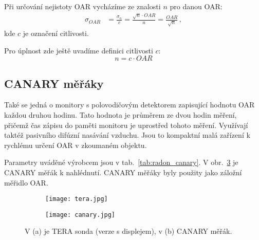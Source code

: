 Při určování nejistoty OAR vycházíme ze znalosti $n$ pro danou OAR:
\begin{align}
    \sigma_{OAR}&=\frac{\sigma_n}{c}=\frac{\sqrt{n}\cdot OAR}{n}=\frac{OAR}{\sqrt{n}}\,,
    \label{eq:radon_OAR_odchylka}
\end{align}
kde $c$ je označení citlivosti.

Pro úplnost zde ještě uvadíme definici citlivosti $c$:
\begin{equation}
    n=c\cdot OAR
    \label{eq:radon_citlivost}
\end{equation}

\subsection{CANARY měřáky}
Také se jedná o monitory s polovodičovým detektorem zapisující hodnotu OAR každou druhou hodinu. Tato hodnota je průměrem ze dvou hodin měření, přičemž čas zápisu do paměti monitoru je uprostřed tohoto měření. Využívají taktéž pasivního difúzní nasávání vzduchu. Jsou to kompaktní malá zařízení k rychlému určení OAR v zkoumaném objektu. 

Parametry uváděné výrobcem jsou v tab.~\ref{tab:radon_canary}. V obr.~\ref{fig:radon_canary} je CANARY měřák k nahlédnutí. CANARY měřáky byly použity jako záložní měřidlo OAR.
\begin{figure}[H]
    \centering
    \begin{subfigure}[b]{0.35\textwidth}
        \texttt{[image: tera.jpg]}
        \caption{}
        \label{fig:radon_tera}
    \end{subfigure}
    \begin{subfigure}[b]{0.3\textwidth}
        \texttt{[image: canary.jpg]}
        \caption{}
        \label{fig:radon_canary}
    \end{subfigure}
    \caption{V (a) je TERA sonda (verze s displejem), v (b) CANARY měřák.}
\end{figure}


